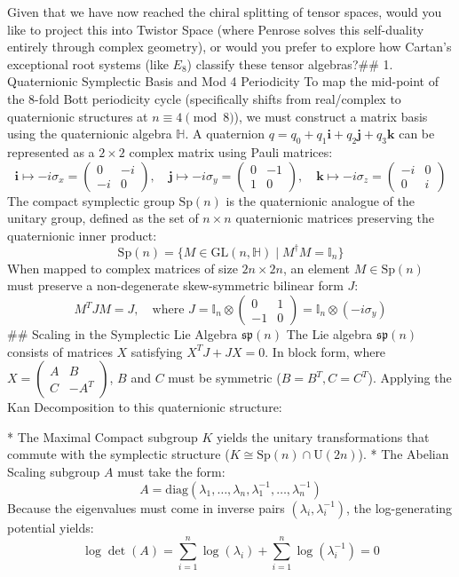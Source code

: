 Given that we have now reached the chiral splitting of tensor spaces, would you like to project this into Twistor Space (where Penrose solves this self-duality entirely through complex geometry), or would you prefer to explore how Cartan's exceptional root systems (like $E_8$) classify these tensor algebras?## 1. Quaternionic Symplectic Basis and Mod 4 Periodicity
To map the mid-point of the 8-fold Bott periodicity cycle (specifically shifts from real/complex to quaternionic structures at $n \equiv 4 \pmod 8$), we must construct a matrix basis using the quaternionic algebra $\mathbb{H}$.
A quaternion $q = q_0 + q_1 \mathbf{i} + q_2 \mathbf{j} + q_3 \mathbf{k}$ can be represented as a $2 \times 2$ complex matrix using Pauli matrices:
$$\mathbf{i} \mapsto -i\sigma_x = \begin{pmatrix} 0 & -i \\ -i & 0 \end{pmatrix}, \quad \mathbf{j} \mapsto -i\sigma_y = \begin{pmatrix} 0 & -1 \\ 1 & 0 \end{pmatrix}, \quad \mathbf{k} \mapsto -i\sigma_z = \begin{pmatrix} -i & 0 \\ 0 & i \end{pmatrix}$$ 
The compact symplectic group $\text{Sp}(n)$ is the quaternionic analogue of the unitary group, defined as the set of $n \times n$ quaternionic matrices preserving the quaternionic inner product:
$$\text{Sp}(n) = \{ M \in \text{GL}(n, \mathbb{H}) \mid M^\dagger M = \mathbb{I}_n \}$$ 
When mapped to complex matrices of size $2n \times 2n$, an element $M \in \text{Sp}(n)$ must preserve a non-degenerate skew-symmetric bilinear form $J$:
$$M^T J M = J, \quad \text{where } J = \mathbb{I}_n \otimes \begin{pmatrix} 0 & 1 \\ -1 & 0 \end{pmatrix} = \mathbb{I}_n \otimes (-i\sigma_y)$$ 
## Scaling in the Symplectic Lie Algebra $\mathfrak{sp}(n)$
The Lie algebra $\mathfrak{sp}(n)$ consists of matrices $X$ satisfying $X^T J + J X = 0$. In block form, where $X = \begin{pmatrix} A & B \\ C & -A^T \end{pmatrix}$, $B$ and $C$ must be symmetric ($B=B^T, C=C^T$).
Applying the Kan Decomposition to this quaternionic structure:

* The Maximal Compact subgroup $K$ yields the unitary transformations that commute with the symplectic structure ($K \cong \text{Sp}(n) \cap \text{U}(2n)$).
* The Abelian Scaling subgroup $A$ must take the form:
$$A = \text{diag}(\lambda_1, \dots, \lambda_n, \lambda_1^{-1}, \dots, \lambda_n^{-1})$$ 
Because the eigenvalues must come in inverse pairs $(\lambda_i, \lambda_i^{-1})$, the log-generating potential yields:
$$\log \det(A) = \sum_{i=1}^n \log(\lambda_i) + \sum_{i=1}^n \log(\lambda_i^{-1}) = 0$$ 

